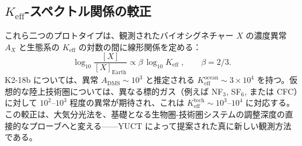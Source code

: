 \documentclass[11pt,a4paper]{article}
\begin{document}
	\subsection{\(K_{\mathrm{eff}}\)-スペクトル関係の較正}
	これら二つのプロトタイプは、観測されたバイオシグネチャー \(X\) の濃度異常 \(A_X\) と生態系の \(K_{\mathrm{eff}}\) の対数の間に線形関係を定める：
	\begin{equation}
		\log_{10} \frac{[X]}{[X]_{\mathrm{Earth}}} \propto
		\beta\,\log_{10} K_{\mathrm{eff}} \; , \qquad \beta = 2/3 .
	\end{equation}
	K2-18b については、異常 \(A_{\mathrm{DMS}} \sim 10^3\) と推定される \(K_{\mathrm{eff}}^{\mathrm{ocean}} \sim 3\times10^4\) を持つ。仮想的な陸上技術圏については、異なる標的ガス（例えば NF$_3$, SF$_6$, または CFC）に対して \(10^2\)–\(10^3\) 程度の異常が期待され、これは \(K_{\mathrm{eff}}^{\mathrm{tech}} \sim 10^3\)–\(10^4\) に対応する。この較正は、大気分光法を、基礎となる生物圏-技術圏システムの調整深度の直接的なプローブへと変える——YUCT によって提案された真に新しい観測方法である。
	
\end{document}
